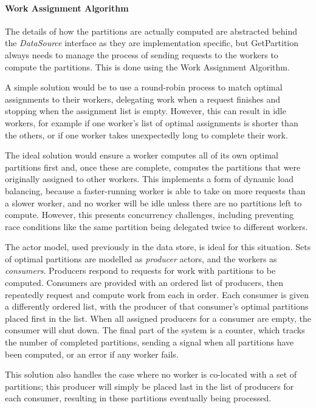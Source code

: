 \paragraph{Work Assignment Algorithm}
The details of how the partitions are actually computed are abstracted behind the \textit{DataSource} interface as they are implementation specific, but GetPartition always needs to manage the process of sending requests to the workers to compute the partitions. This is done using the Work Assignment Algorithm. 

A simple solution would be to use a round-robin process to match optimal assignments to their workers, delegating work when a request finishes and stopping when the assignment list is empty. However, this can result in idle workers, for example if one worker's list of optimal assignments is shorter than the others, or if one worker takes unexpectedly long to complete their work.

The ideal solution would ensure a worker computes all of its own optimal partitions first and, once these are complete, computes the partitions that were originally assigned to other workers. This implements a form of dynamic load balancing, because a faster-running worker is able to take on more requests than a slower worker, and no worker will be idle unless there are no partitions left to compute. However, this presents concurrency challenges, including preventing race conditions like the same partition being delegated twice to different workers.

The actor model, used previously in the data store, is ideal for this situation. Sets of optimal partitions are modelled as \textit{producer} actors, and the workers as \textit{consumers}. Producers respond to requests for work with partitions to be computed. Consumers are provided with an ordered list of producers, then repeatedly request and compute work from each in order. Each consumer is given a differently ordered list, with the producer of that consumer's optimal partitions placed first in the list. When all assigned producers for a consumer are empty, the consumer will shut down. The final part of the system is a counter, which tracks the number of completed partitions, sending a signal when all partitions have been computed, or an error if any worker fails.

This solution also handles the case where no worker is co-located with a set of partitions; this producer will simply be placed last in the list of producers for each consumer, resulting in these partitions eventually being processed.

